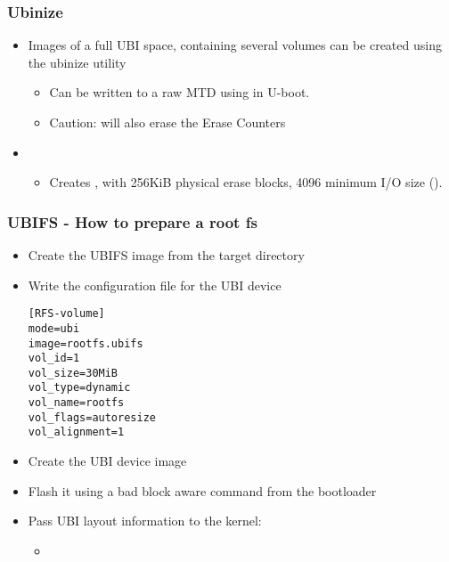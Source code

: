 \begin{frame}
  \frametitle{Ubinize}
  \begin{itemize}
  \item Images of a full UBI space, containing several volumes can be
    created using the ubinize utility
    \begin{itemize}
    \item Can be written to a raw MTD using  in U-boot.
    \item Caution:  will also erase the Erase
      Counters
    \end{itemize}
  \item {}
    \begin{itemize}
    \item Creates , with 256KiB physical erase blocks,
      4096 minimum I/O size ().
    \end{itemize}
  \end{itemize}
\end{frame}

\begin{frame}[fragile]
  \frametitle{UBIFS - How to prepare a root fs}
  \begin{itemize}
  \item Create the UBIFS image from the target directory
  \item Write the configuration file for the UBI device
\small
\begin{verbatim}
[RFS-volume]
mode=ubi
image=rootfs.ubifs
vol_id=1
vol_size=30MiB
vol_type=dynamic
vol_name=rootfs
vol_flags=autoresize
vol_alignment=1
\end{verbatim}
\normalsize
  \item Create the UBI device image
  \item Flash it using a bad block aware command from the bootloader
  \item Pass UBI layout information to the kernel:
    \begin{itemize}
    \item {}
    \end{itemize}
  \end{itemize}
\end{frame}

